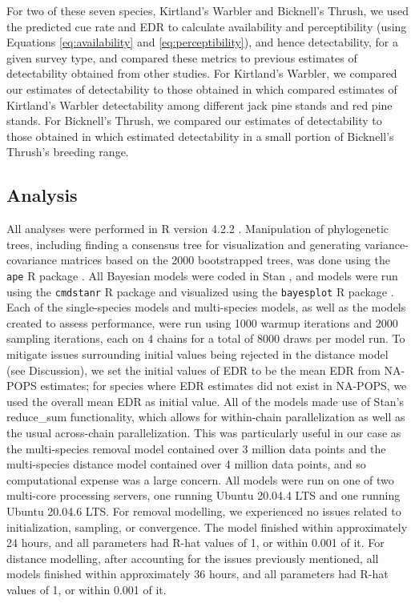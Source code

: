 \documentclass[12pt]{article}
\begin{document}
\par For two of these seven species, Kirtland's Warbler and Bicknell's Thrush, we used the predicted cue rate and EDR to calculate availability and perceptibility (using Equations \ref{eq:availability} and \ref{eq:perceptibility}), and hence detectability, for a given survey type, and compared these metrics to previous estimates of detectability obtained from other studies.
For Kirtland's Warbler, we compared our estimates of detectability to those obtained in \citet{van_dyke_comparative_2022} which compared estimates of Kirtland's Warbler detectability among different jack pine stands and red pine stands.
For Bicknell's Thrush, we compared our estimates of detectability to those obtained in \citet{aubry_bicknells_2018} which estimated detectability in a small portion of Bicknell's Thrush's breeding range.

\subsection{Analysis}
\par All analyses were performed in R version 4.2.2 \citep{r_core_team_r_2022}.
Manipulation of phylogenetic trees, including finding a consensus tree for visualization and generating variance-covariance matrices based on the 2000 bootstrapped trees, was done using the \texttt{ape} R package \citep{paradis_ape_2019}.
All Bayesian models were coded in Stan \citep{stan_development_team_stan_2024}, and models were run using the \texttt{cmdstanr} R package \citep{gabry_cmdstanr_2023} and visualized using the \texttt{bayesplot} R package \citep{gabry_visualization_2019}.
Each of the single-species models and multi-species models, as well as the models created to assess performance, were run using 1000 warmup iterations and 2000 sampling iterations, each on 4 chains for a total of 8000 draws per model run.
To mitigate issues surrounding initial values being rejected in the distance model (see Discussion), we set the initial values of EDR to be the mean EDR from NA-POPS \citep{edwards_point_2023} estimates; for species where EDR estimates did not exist in NA-POPS, we used the overall mean EDR as initial value.
All of the models made use of Stan's reduce\_sum functionality, which allows for within-chain parallelization as well as the usual across-chain parallelization.
This was particularly useful in our case as the multi-species removal model contained over 3 million data points and the multi-species distance model contained over 4 million data points, and so computational expense was a large concern.
All models were run on one of two multi-core processing servers, one running Ubuntu 20.04.4 LTS and one running Ubuntu 20.04.6 LTS.
For removal modelling, we experienced no issues related to initialization, sampling, or convergence. 
The model finished within approximately 24 hours, and all parameters had R-hat values of 1, or within 0.001 of it. 
For distance modelling, after accounting for the issues previously mentioned, all models finished within approximately 36 hours, and all parameters had R-hat values of 1, or within 0.001 of it.
\end{document}
